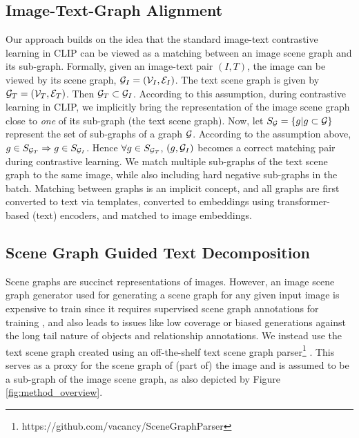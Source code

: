 \documentclass[11pt]{article}
\begin{document}
\subsection{Image-Text-Graph Alignment}
\label{subsec_itg_alignment}
Our approach builds on the idea that the standard image-text contrastive learning in CLIP can be viewed as a matching between an image scene graph and its sub-graph. Formally, given an image-text pair $(I, T)$, the image can be viewed by its scene graph, $\mathcal{G}_I = (\mathcal{V}_I, \mathcal{E}_I)$. The text scene graph is given by $\mathcal{G}_T = (\mathcal{V}_T, \mathcal{E}_T)$. Then $\mathcal{G}_T \subset \mathcal{G}_I$. According to this assumption, during contrastive learning in CLIP, we implicitly bring the representation of the image scene graph close to \textit{one} of its sub-graph (the text scene graph).
Now, let $S_{\mathcal{G}} = \{g | g \subset \mathcal{G}\}$ represent the set of sub-graphs of a graph $\mathcal{G}$. According to the assumption above, $g \in S_{\mathcal{G}_T} \Rightarrow g \in S_{\mathcal{G}_I}$. Hence $\forall g \in S_{\mathcal{G}_T}$, $(g, \mathcal{G}_I)$ becomes a correct matching pair during contrastive learning.
We match multiple sub-graphs of the text scene graph to the same image, while also including hard negative sub-graphs in the batch. Matching between graphs is an implicit concept, and all graphs are first converted to text via templates, converted to embeddings using transformer-based (text) encoders, and matched to image embeddings.


\subsection{Scene Graph Guided Text Decomposition}
\label{subsec_sg_decomposition}
Scene graphs are succinct representations of images. However, an image scene graph generator used for generating a scene graph for any given input image is expensive to train since it requires supervised scene graph annotations for training \citep{li2017scene, xu2017scene, zhang2019graphical}, and also leads to issues like low coverage or biased generations against the long tail nature of objects and relationship annotations. We instead use the text scene graph created using an off-the-shelf text scene graph parser\footnote{https://github.com/vacancy/SceneGraphParser} \citep{wu2019unified}. This serves as a proxy for the scene graph of (part of) the image and is assumed to be a sub-graph of the image scene graph, as also depicted by Figure \ref{fig:method_overview}.
\end{document}
